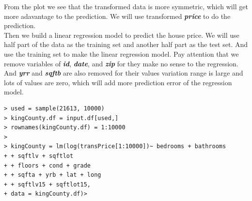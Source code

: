 \documentclass{article}%
\begin{document}
From the plot we see that the transformed data is more symmetric, which will get more adavantage to the prediction. We will use transformed  \emph{\textbf{price}} to do the prediction.\\

Then we build a linear regression model to predict the house price. We will use half part of the data as the training set and another half part as the test set. And use the training set to make the linear regression model. Pay attention that we remove variables of  \emph{\textbf{id}},  \emph{\textbf{date}},  and \emph{\textbf{zip}} for they make no sense to the regression. And  \emph{\textbf{yrr}} and  \emph{\textbf{sqftb}} are also removed for their values variation range is large and lots of values are zero, which will add more prediction error of the regression model.
\begin{verbatim}
> used = sample(21613, 10000)
> kingCounty.df = input.df[used,]
> rownames(kingCounty.df) = 1:10000
> 
> kingCounty = lm(log(transPrice[1:10000])~ bedrooms + bathrooms
+ + sqftlv + sqftlot
+ + floors + cond + grade 
+ + sqfta + yrb + lat + long
+ + sqftlv15 + sqftlot15,
+ data = kingCounty.df)>
\end{verbatim}
\end{document}
